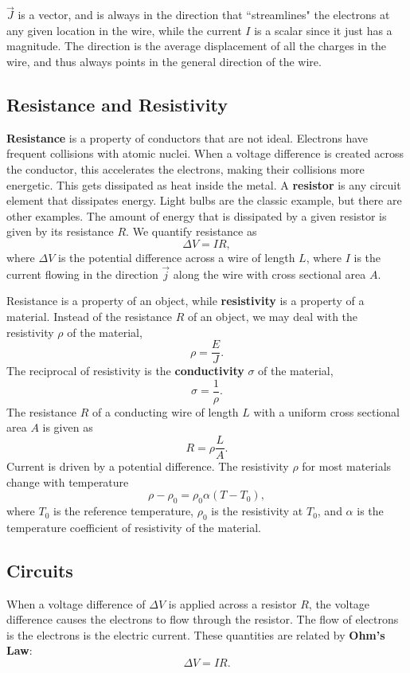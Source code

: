 \documentclass[11pt]{article}
\theoremstyle{plain} %
\theoremstyle{definition}
\theoremstyle{example}
\theoremstyle{remark}
\begin{document}
$\vec{J}$ is a vector, and is always in the direction that ``streamlines" the electrons at any given location in the wire, while the current $I$ is a scalar since it just has a magnitude. The direction is the average displacement of all the charges in the wire, and thus always points in the general direction of the wire. 

\subsection{Resistance and Resistivity}

\textbf{Resistance} is a property of conductors that are not ideal. Electrons have frequent collisions with atomic nuclei. When a voltage difference is created across the conductor, this accelerates the electrons, making their collisions more energetic. This gets dissipated as heat inside the metal. A \textbf{resistor} is any circuit element that dissipates energy. Light bulbs are the classic example, but there are other examples. The amount of energy that is dissipated by a given resistor is given by its resistance $R$. We quantify resistance as 
$$\Delta V = IR,$$
where $\Delta V$ is the potential difference across a wire of length $L$, where $I$ is the current flowing in the direction $\vec{j}$ along the wire with cross sectional area $A$. 

Resistance is a property of an object, while \textbf{resistivity} is a property of a material. Instead of the resistance $R$ of an object, we may deal with the resistivity $\rho$ of the material,
$$\rho = \frac{E}{J}.$$
The reciprocal of resistivity is the \textbf{conductivity} $\sigma$ of the material, 
$$\sigma = \frac{1}{\rho}.$$
The resistance $R$ of a conducting wire of length $L$ with a uniform cross sectional area $A$ is given as 
$$R = \rho\frac{L}{A}.$$
Current is driven by a potential difference. The resistivity $\rho$ for most materials change with temperature
$$\rho - \rho_0 = \rho_0\alpha(T-T_0),$$
where $T_0$ is the reference temperature, $\rho_0$ is the resistivity at $T_0$, and $\alpha$ is the temperature coefficient of resistivity of the material. 

\subsection{Circuits}

When a voltage difference of $\Delta V$ is applied across a resistor $R$, the voltage difference causes the electrons to flow through the resistor. The flow of electrons is the electrons is the electric current. These quantities are related by \textbf{Ohm's Law}:
$$\Delta V = IR.$$
\end{document}
